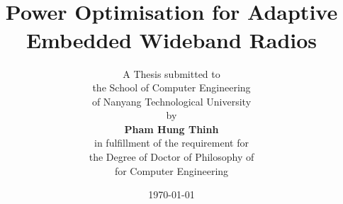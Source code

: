 
\title{\sc
{}\\[3em]
\vspace{-0.5in}Power Optimisation for Adaptive Embedded Wideband Radios  \\
\vspace*{0.3in} \centering
}

\author{
A Thesis submitted to\\
the School of Computer Engineering\\
of Nanyang Technological University\\[1em]
by\\[1em]
{\rm\bf Pham Hung Thinh}\\[1.5em]
in fulfillment of the requirement for \\
the Degree of Doctor of Philosophy of\\
for Computer Engineering\\[1.5em]
}

\date{\today}
\maketitle
\thispagestyle{empty}        %
